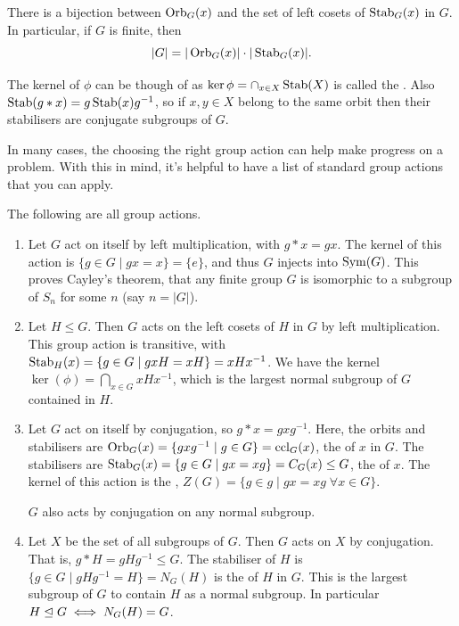 \documentclass[a4paper]{scrartcl}
\begin{document}
\begin{theorem}
	There is a bijection between $\operatorname{Orb}_G(x)$ and the set of left cosets of $\operatorname{Stab}_G(x)$ in $G$. In particular, if $G$ is finite, then
	$$
	|G| = |\operatorname{Orb}_G(x)| \cdot |\operatorname{Stab}_G(x)|.
	$$
\end{theorem}

\begin{remark}
	The kernel of $\phi$ can be though of as $\operatorname{ker} \phi = \cap_{x \in X} \operatorname{Stab}(X)$ is called the .
	Also $\operatorname{Stab}(g * x) = g \operatorname{Stab}(x) g^{-1}$, so if $x, y \in X$ belong to the same orbit then their stabilisers are conjugate subgroups of $G$.
\end{remark}


In many cases, the choosing the right group action can help make progress on a problem. With this in mind, it's helpful to have a list of standard group actions that you can apply.

\begin{example}
	The following are all group actions.
	\begin{enumerate}[label=(\roman*)]
		\item Let $G$ act on itself by left multiplication, with $g * x = gx$. The kernel of this action is $\{g \in G \mid gx = x \} = \{e\}$, and thus $G$ injects into $\operatorname{Sym}(G)$. This proves Cayley's theorem, that any finite group $G$ is isomorphic to a subgroup of $S_n$ for some $n$ (say $n = |G|$).
		\item Let $H \leq G$. Then $G$ acts on the left cosets of $H$ in $G$ by left multiplication. This group action is transitive, with $\operatorname{Stab}_H(x) = \{ g \in G \mid gxH = xH \} = xHx^{-1}$. We have the kernel $\ker(\phi) = \bigcap_{x \in G} xHx^{-1}$, which is the largest normal subgroup of $G$ contained in $H$.
		\item Let $G$ act on itself by conjugation, so $g * x = gxg^{-1}$. Here, the orbits and stabilisers are $\operatorname{Orb}_G(x) = \{ gxg^{-1} \mid g \in G \} = \operatorname{ccl}_G(x)$, the  of $x$ in $G$. The stabilisers are $\operatorname{Stab}_G(x) = \{ g \in G \mid gx = xg \} = C_G(x) \leq G$, the  of $x$. The kernel of this action is the , $Z(G) = \{ g \in g \mid gx = xg \; \forall x \in G \}$.
		
		$G$ also acts by conjugation on any normal subgroup.

		\item Let $X$ be the set of all subgroups of $G$. Then $G$ acts on $X$ by conjugation. That is, $g * H = g H g^{-1} \leq G$. The stabiliser of $H$ is $\{g \in G \mid gHg^{-1} = H \} = N_G(H)$ is the  of $H$ in $G$. This is the largest subgroup of $G$ to contain $H$ as a normal subgroup. In particular $H \trianglelefteq G \iff N_G(H) = G$. 
	\end{enumerate}
\end{example}
\end{document}
